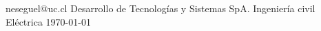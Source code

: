 \documentclass{style}
\begin{document}
\graphicspath{ {./img/} }

        {neseguel@uc.cl} %
        {Desarrollo de Tecnologías y Sistemas SpA.}
        {Ingeniería civil Eléctrica} %
        {\today} %



\tableofcontents \newpage
\listoftables \newpage
\listoffigures \newpage



\newpage
% 




\end{document}
